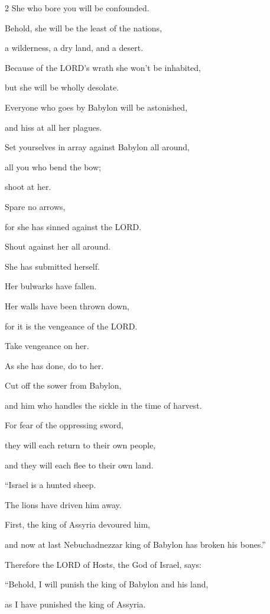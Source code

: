 \begin{multicols}{2}
She who bore you will be confounded.

Behold, she will be the least of the nations,

a wilderness, a dry land, and a desert.


\myverse{}Because of the LORD’s wrath she won’t be inhabited,

but she will be wholly desolate.

Everyone who goes by Babylon will be astonished,

and hiss at all her plagues.


\myverse{}Set yourselves in array against Babylon all around,

all you who bend the bow;

shoot at her.

Spare no arrows,

for she has sinned against the LORD.


\myverse{}Shout against her all around.

She has submitted herself.

Her bulwarks have fallen.

Her walls have been thrown down,

for it is the vengeance of the LORD.

Take vengeance on her.

As she has done, do to her.


\myverse{}Cut off the sower from Babylon,

and him who handles the sickle in the time of harvest.

For fear of the oppressing sword,

they will each return to their own people,

and they will each flee to their own land.

\vspace{\baselineskip}

\myverse{}“Israel is a hunted sheep.

The lions have driven him away.

First, the king of Assyria devoured him,

and now at last Nebuchadnezzar king of Babylon has broken his bones.”


\myverse{}Therefore the LORD of Hosts, the God of Israel, says:

“Behold, I will punish the king of Babylon and his land,

as I have punished the king of Assyria.



\end{multicols}
